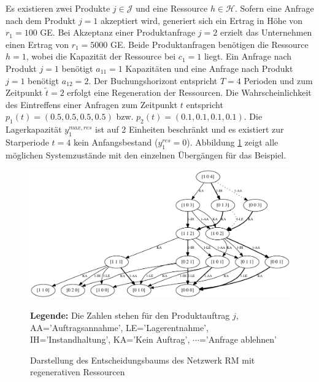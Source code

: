 Es existieren zwei Produkte $j\in\mathcal{J}$ und eine Ressource $h\in\mathcal{H}$. Sofern eine Anfrage nach dem Produkt $j=1$ akzeptiert wird, generiert sich ein Ertrag in Höhe von $r_1=100$ GE. Bei Akzeptanz einer Produktanfrage $j=2$ erzielt das Unternehmen einen Ertrag von $r_1=5000$ GE. Beide Produktanfragen benötigen die Ressource $h=1$, wobei die Kapazität der Ressource bei $c_1=1$ liegt. Ein Anfrage nach Produkt $j=1$ benötigt $a_{11}=1$ Kapazitäten und eine Anfrage nach Produkt $j=1$ benötigt $a_{12}=2$. Der Buchungshorizont entspricht $T=4$ Perioden und zum Zeitpunkt $\tilde{t}=2$ erfolgt eine Regeneration der Ressourcen. Die Wahrscheinlichkeit des Eintreffens einer Anfragen zum Zeitpunkt $t$ entspricht $ p_{1}(t)=(0.5, 0.5, 0.5, 0.5)$ bzw. $ p_{2}(t)=(0.1, 0.1, 0.1, 0.1)$. Die Lagerkapazität $y_1^{max,res}$ ist auf 2 Einheiten beschränkt und es existiert zur Starperiode $t=4$ kein Anfangsbestand ($y_1^{res}=0$). Abbildung \ref{B6} zeigt alle möglichen Systemzustände mit den einzelnen Übergängen für das Beispiel. 

\begin{figure}[h!]
  \begin{center}
    \includegraphics[width=140mm]{Bilder/Beispiel6.pdf}
    \caption{Darstellung des Entscheidungsbaums des Netzwerk RM mit regenerativen Ressourcen}  \label{B6}
    {\footnotesize \textbf{Legende:} Die Zahlen stehen für den Produktauftrag $j$, AA='Auftragsannahme', LE='Lagerentnahme', IH='Instandhaltung', KA='Kein Auftrag', $\cdots$='Anfrage ablehnen'} 
  \end{center}
\end{figure}

